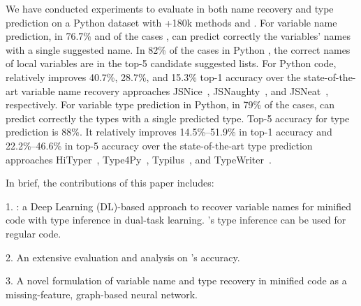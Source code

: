 We have conducted experiments to evaluate {\tool} in both name
recovery and type prediction on a Python dataset with +180k methods
and {\color{blue}{and a JavaScript (JS) dataset with 322k
    files}}. For variable name prediction, in 76.7\% and
{\color{blue}{79.9\%}} of the cases {\color{blue}{in Python and JS
    code respectively}}, {\tool} can predict correctly the variables'
names with a single suggested name. In 82\% {\color{blue}{and 87.3\%}}
of the cases in Python {\color{blue}{and JS code}}, the correct names of local variables are in the top-5 candidate suggested lists. For Python code, {\tool}
relatively improves 40.7\%, 28.7\%, and 15.3\% top-1 accuracy over the
state-of-the-art variable name recovery approaches
JSNice~\cite{JSNice2015}, JSNaughty~\cite{JSNaughty2017}, and
JSNeat~\cite{icse19}, respectively.
%
{\color{blue}{For JS code, the relative improvements over those baselines are 46.6\%,
    34.0\%, and 5.4\%, respectively.}} For variable type prediction
in Python, in 79\% of the cases, {\tool} can predict correctly the
types with a single predicted type. Top-5 accuracy for type prediction
is 88\%. It relatively improves 14.5\%--51.9\% in top-1 accuracy and
22.2\%--46.6\% in top-5 accuracy over the state-of-the-art type
prediction approaches HiTyper~\cite{HiTyper-icse22},
Type4Py~\cite{Type4Py-icse22}, Typilus~\cite{typilus-pldi20}, and
TypeWriter~\cite{typewriter-fse20}.

In brief, the contributions of this paper includes:

1. {\bf {\tool}}: a Deep Learning (DL)-based approach to recover
variable names for minified code with type inference in dual-task
learning. {\tool}'s type inference can be used for regular code.

2. An extensive evaluation and analysis on {\tool}'s
accuracy.



3. A novel formulation of variable name and type recovery in
minified code as a missing-feature, graph-based neural network.
